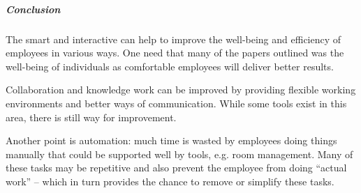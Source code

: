 
\subparagraph{Conclusion}
The smart and interactive can help to improve the well-being and efficiency of employees in various ways. One need that many of the papers outlined was the well-being of individuals as comfortable employees will deliver better results.

Collaboration and knowledge work can be improved by providing flexible working environments and better ways of communication. While some tools exist in this area, there is still way for improvement. 

Another point is automation: much time is wasted by employees doing things manually that could be supported well by tools, e.g. room management. Many of these tasks may be repetitive and also prevent the employee from doing ``actual work'' -- which in turn provides the chance to remove or simplify these tasks.
